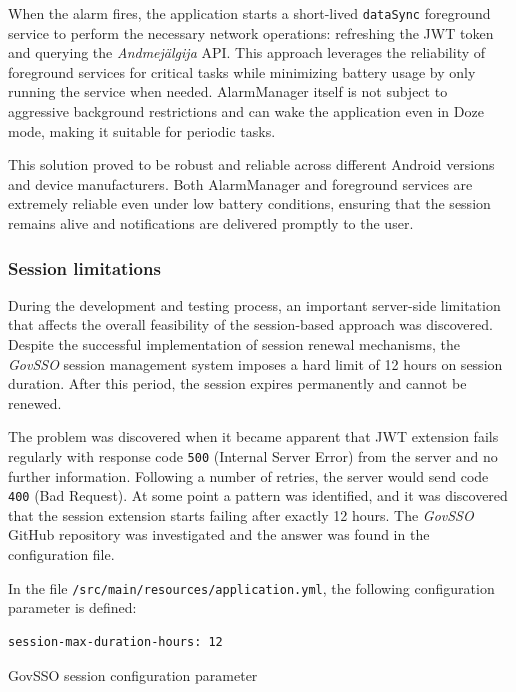 When the alarm fires, the application starts a short-lived \texttt{dataSync} foreground service to perform the necessary network operations: refreshing the JWT token and querying the \textit{Andmejälgija} API. This approach leverages the reliability of foreground services for critical tasks while minimizing battery usage by only running the service when needed. AlarmManager itself is not subject to aggressive background restrictions and can wake the application even in Doze mode, making it suitable for periodic tasks.

This solution proved to be robust and reliable across different Android versions and device manufacturers. Both AlarmManager and foreground services are extremely reliable even under low battery conditions, ensuring that the session remains alive and notifications are delivered promptly to the user.

\subsubsection{Session limitations}
\label{session-limitations}
During the development and testing process, an important server-side limitation that affects the overall feasibility of the session-based approach was discovered. Despite the successful implementation of session renewal mechanisms, the \textit{GovSSO} session management system imposes a hard limit of 12 hours on session duration. After this period, the session expires permanently and cannot be renewed.

The problem was discovered when it became apparent that JWT extension fails regularly with response code \texttt{500} (Internal Server Error) from the server and no further information. Following a number of retries, the server would send code \texttt{400} (Bad Request). At some point a pattern was identified, and it was discovered that the session extension starts failing after exactly 12 hours. The \textit{GovSSO} GitHub repository \cite{govsso-session} was investigated and the answer was found in the configuration file.

In the file \texttt{/src/main/resources/application.yml}, the following configuration parameter is defined\cite{govsso-session-config}:

\begin{listing}[H]
\begin{verbatim}
session-max-duration-hours: 12
\end{verbatim}
\caption{GovSSO session configuration parameter\cite{govsso-session-config}}
\label{lst:govsso-config}
\end{listing}

